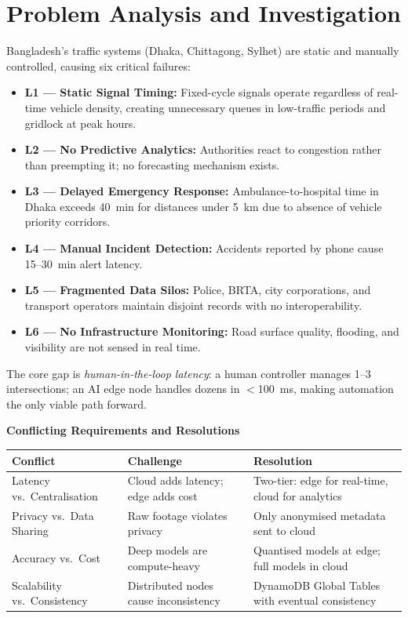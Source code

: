 \documentclass[11pt,a4paper]{article}
\begin{document}
\section{Problem Analysis and Investigation}

Bangladesh's traffic systems (Dhaka, Chittagong, Sylhet) are static and manually controlled, causing six critical failures:

\begin{itemize}
  \item \textbf{L1 — Static Signal Timing:} Fixed-cycle signals operate regardless of real-time vehicle density, creating unnecessary queues in low-traffic periods and gridlock at peak hours.
  \item \textbf{L2 — No Predictive Analytics:} Authorities react to congestion rather than preempting it; no forecasting mechanism exists.
  \item \textbf{L3 — Delayed Emergency Response:} Ambulance-to-hospital time in Dhaka exceeds 40~min for distances under 5~km due to absence of vehicle priority corridors.
  \item \textbf{L4 — Manual Incident Detection:} Accidents reported by phone cause 15--30~min alert latency.
  \item \textbf{L5 — Fragmented Data Silos:} Police, BRTA, city corporations, and transport operators maintain disjoint records with no interoperability.
  \item \textbf{L6 — No Infrastructure Monitoring:} Road surface quality, flooding, and visibility are not sensed in real time.
\end{itemize}

The core gap is \emph{human-in-the-loop latency}: a human controller manages 1--3 intersections; an AI edge node handles dozens in $<$100~ms, making automation the only viable path forward.

\vspace{3pt}
\noindent\textbf{Conflicting Requirements and Resolutions}
\vspace{3pt}

\renewcommand{\arraystretch}{1.25}
\begin{center}
\begin{tabular}{|B{3cm}|L{4cm}|L{4.8cm}|}
\hline
\textbf{Conflict} & \textbf{Challenge} & \textbf{Resolution} \\
\hline
Latency vs.\ Centralisation & Cloud adds latency; edge adds cost & Two-tier: edge for real-time, cloud for analytics \\
\hline
Privacy vs.\ Data Sharing & Raw footage violates privacy & Only anonymised metadata sent to cloud \\
\hline
Accuracy vs.\ Cost & Deep models are compute-heavy & Quantised models at edge; full models in cloud \\
\hline
Scalability vs.\ Consistency & Distributed nodes cause inconsistency & DynamoDB Global Tables with eventual consistency \\
\hline
\end{tabular}
\end{center}
\end{document}
